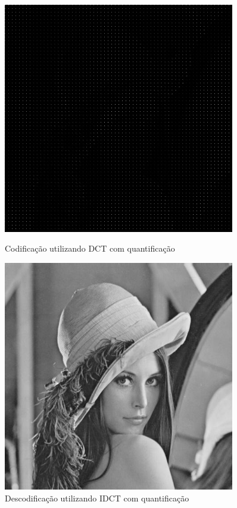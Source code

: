 \documentclass[12pt,a4paper]{article}
\begin{document}
\begin{figure}[h]
	\centering
    \begin{minipage}{0.45\textwidth}
        \centering
        \includegraphics[width=0.9\textwidth]{imagens/dct75.jpg}
        \caption{Codificação utilizando DCT com quantificação}
    \end{minipage}\hfill
    \begin{minipage}{0.45\textwidth}
        \centering
        \includegraphics[width=0.9\textwidth]{imagens/idct75.jpg}
        \caption{Descodificação utilizando IDCT com quantificação}
    \end{minipage}
\end{figure}
\end{document}
